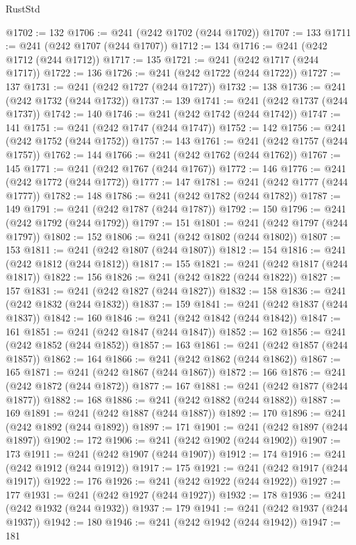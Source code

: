 \begin{lexlean}{RustStd}
\begin{coremodule}
@1702 := 132
@1706 := @241 (@242 @1702 (@244 @1702))
@1707 := 133
@1711 := @241 (@242 @1707 (@244 @1707))
@1712 := 134
@1716 := @241 (@242 @1712 (@244 @1712))
@1717 := 135
@1721 := @241 (@242 @1717 (@244 @1717))
@1722 := 136
@1726 := @241 (@242 @1722 (@244 @1722))
@1727 := 137
@1731 := @241 (@242 @1727 (@244 @1727))
@1732 := 138
@1736 := @241 (@242 @1732 (@244 @1732))
@1737 := 139
@1741 := @241 (@242 @1737 (@244 @1737))
@1742 := 140
@1746 := @241 (@242 @1742 (@244 @1742))
@1747 := 141
@1751 := @241 (@242 @1747 (@244 @1747))
@1752 := 142
@1756 := @241 (@242 @1752 (@244 @1752))
@1757 := 143
@1761 := @241 (@242 @1757 (@244 @1757))
@1762 := 144
@1766 := @241 (@242 @1762 (@244 @1762))
@1767 := 145
@1771 := @241 (@242 @1767 (@244 @1767))
@1772 := 146
@1776 := @241 (@242 @1772 (@244 @1772))
@1777 := 147
@1781 := @241 (@242 @1777 (@244 @1777))
@1782 := 148
@1786 := @241 (@242 @1782 (@244 @1782))
@1787 := 149
@1791 := @241 (@242 @1787 (@244 @1787))
@1792 := 150
@1796 := @241 (@242 @1792 (@244 @1792))
@1797 := 151
@1801 := @241 (@242 @1797 (@244 @1797))
@1802 := 152
@1806 := @241 (@242 @1802 (@244 @1802))
@1807 := 153
@1811 := @241 (@242 @1807 (@244 @1807))
@1812 := 154
@1816 := @241 (@242 @1812 (@244 @1812))
@1817 := 155
@1821 := @241 (@242 @1817 (@244 @1817))
@1822 := 156
@1826 := @241 (@242 @1822 (@244 @1822))
@1827 := 157
@1831 := @241 (@242 @1827 (@244 @1827))
@1832 := 158
@1836 := @241 (@242 @1832 (@244 @1832))
@1837 := 159
@1841 := @241 (@242 @1837 (@244 @1837))
@1842 := 160
@1846 := @241 (@242 @1842 (@244 @1842))
@1847 := 161
@1851 := @241 (@242 @1847 (@244 @1847))
@1852 := 162
@1856 := @241 (@242 @1852 (@244 @1852))
@1857 := 163
@1861 := @241 (@242 @1857 (@244 @1857))
@1862 := 164
@1866 := @241 (@242 @1862 (@244 @1862))
@1867 := 165
@1871 := @241 (@242 @1867 (@244 @1867))
@1872 := 166
@1876 := @241 (@242 @1872 (@244 @1872))
@1877 := 167
@1881 := @241 (@242 @1877 (@244 @1877))
@1882 := 168
@1886 := @241 (@242 @1882 (@244 @1882))
@1887 := 169
@1891 := @241 (@242 @1887 (@244 @1887))
@1892 := 170
@1896 := @241 (@242 @1892 (@244 @1892))
@1897 := 171
@1901 := @241 (@242 @1897 (@244 @1897))
@1902 := 172
@1906 := @241 (@242 @1902 (@244 @1902))
@1907 := 173
@1911 := @241 (@242 @1907 (@244 @1907))
@1912 := 174
@1916 := @241 (@242 @1912 (@244 @1912))
@1917 := 175
@1921 := @241 (@242 @1917 (@244 @1917))
@1922 := 176
@1926 := @241 (@242 @1922 (@244 @1922))
@1927 := 177
@1931 := @241 (@242 @1927 (@244 @1927))
@1932 := 178
@1936 := @241 (@242 @1932 (@244 @1932))
@1937 := 179
@1941 := @241 (@242 @1937 (@244 @1937))
@1942 := 180
@1946 := @241 (@242 @1942 (@244 @1942))
@1947 := 181

\end{coremodule}
\end{lexlean}
